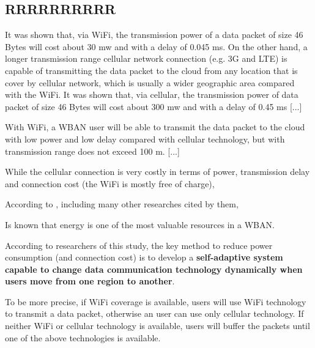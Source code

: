 \documentclass[sigchi]{acmart}
\begin{document}
\subsection{RRRRRRRRRR}

\begin{quoting}[font=itshape, begintext={``}, endtext={''\cite[par.~3.1]{MSAReport}}]
It was shown that, via WiFi, the transmission power of a data packet of size 46 Bytes will cost about 30 mw and with a delay of 0.045 ms. On the other hand, a longer transmission range cellular network connection (e.g. 3G and LTE) is capable of transmitting the data packet to the cloud from any location that is cover by cellular network, which is usually a wider geographic area compared with the WiFi. It was shown that, via cellular, the transmission power of data packet of size 46 Bytes will cost about 300 mw and with a delay of 0.45 ms [...]


With WiFi, a WBAN user will be able to transmit the data packet to the cloud with low power and low delay compared with cellular technology, but with transmission range does not exceed 100 m. [...]


While the cellular connection is very costly in terms of power, transmission delay and connection cost (the WiFi is mostly free of charge),
\end{quoting}

\vspace{0.3cm}

According to \citet{MSAReport}, including many other researches cited by them, 

Is known that energy is one of the most valuable resources in a WBAN.

According to researchers of this study, the key method to reduce power consumption (and connection cost) is to develop a \textbf{self-adaptive system capable to change data communication technology dynamically when users move from one region to another}. 

To be more precise, if WiFi coverage is available, users will use WiFi technology to transmit a data packet, otherwise an user can use only cellular technology. If neither WiFi or cellular technology is available, users will buffer the packets until one of the above technologies is available.\cite[par.~3.1]{MSAReport}


\subsection{}
\end{document}
